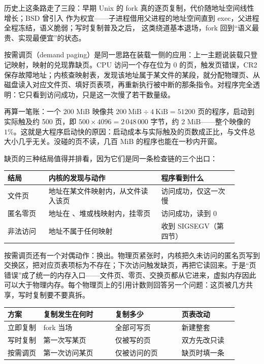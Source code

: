 历史上这条路走了三段：早期 Unix 的 fork 真的逐页复制，代价随地址空间线性增长；BSD 曾引入  作为权宜——子进程借用父进程的地址空间直到 exec，父进程全程冻结，语义脆弱；写时复制普及之后， 这类绕道基本退场，fork 回到“语义最贵、实现最便宜”的状态。

按需调页（demand paging）是同一思路在装载一侧的应用：上一主题说装载只登记映射，映射的兑现靠缺页。CPU 访问一个存在位为 0 的页，触发页错误，CR2 保存故障地址；内核查映射表，发现该地址属于某文件的某段，就分配物理页、从磁盘读入对应文件页、填好页表项，再重新执行被中断的那条指令。对程序完全透明：它只看到访问成功，只是这一次慢了若干数量级。

再算一笔账：一个 200 MiB 映像共 $200\ \text{MiB}\div4\ \text{KiB}=51200$ 页的程序，启动到  实际触及约 500 页，即 $500\times4096=2\,048\,000$ 字节，约 2 MiB——整个映像的 $1\%$。这就是大程序启动快的原因：启动成本与实际触及的页数成正比，与文件总大小几乎无关。没碰的页不读，几百 MiB 的程序也能在一秒内开窗。

缺页的三种结局值得并排看，因为它们是同一条检查链的三个出口：

\begin{longtable}{L{0.16\linewidth}L{0.44\linewidth}L{0.30\linewidth}}
\toprule
结局 & 内核的发现与动作 & 程序看到什么 \\
\midrule
文件页 & 地址在某文件映射内，从文件读入该页 & 访问成功，仅这一次慢 \\\tablerowrule
匿名零页 & 地址在 、堆或栈映射内，挂零页 & 访问成功，读到 0 \\\tablerowrule
非法访问 & 地址不属于任何映射 & 收到 SIGSEGV（第四节） \\
\bottomrule
\end{longtable}

按需调页还有一个对偶动作：换出。物理页紧张时，内核把久未访问的匿名页写到交换区，把对应页表项标为不存在；下次访问触发缺页，再把它读回来。于是“页错误”成了统一的内存入口——文件页、零页、交换页都从它进来，虚拟内存因此可以大于物理内存。每个物理页上的引用计数则回答另一个问题：这页被几方共享，写时复制要不要真拆。

\begin{longtable}{L{0.14\linewidth}L{0.28\linewidth}L{0.26\linewidth}L{0.22\linewidth}}
\toprule
方案 & 复制发生在何时 & 复制多少 & 页表改动 \\
\midrule
立即复制 & fork 当场 & 全部可写页 & 新建整套 \\\tablerowrule
写时复制 & 第一次写某页 & 仅被写的页 & 双方先改只读 \\\tablerowrule
按需调页 & 第一次访问某页 & 仅被访问的页 & 缺页时填一条 \\
\bottomrule
\end{longtable}

